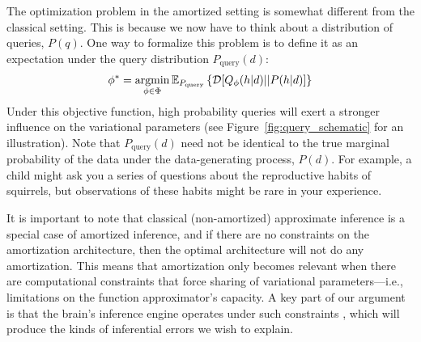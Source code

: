 The optimization problem in the amortized setting is somewhat different from the classical setting. This is because we now have to think about a distribution of queries, $P(q)$. One way to formalize this problem is to define it as an expectation under the query distribution $P_\text{query}(d)$:
\begin{align}
\phi^\ast = \operatorname*{argmin}_{\phi \in \Phi} \mathbb{E}_{P_\text{query}}\left\{ \mathcal{D}[Q_\phi(h|d)||P(h|d)] \right \}
\label{eq:amort}
\end{align}
Under this objective function, high probability queries will exert a stronger influence on the variational parameters (see Figure~\ref{fig:query_schematic} for an illustration). Note that $P_\text{query}(d)$ need not be identical to the true marginal probability of the data under the data-generating process, $P(d)$. For example, a child might ask you a series of questions about the reproductive habits of squirrels, but observations of these habits might be rare in your experience.

It is important to note that classical (non-amortized) approximate inference is a special case of amortized inference, and if there are no constraints on the amortization architecture, then the optimal architecture will not do any amortization. This means that amortization only becomes relevant when there are computational constraints that force sharing of variational parameters---i.e., limitations on the function approximator's capacity. A key part of our argument is that the brain's inference engine operates under such constraints \citep[see][]{feng2014multitasking,alon2017graph}, which will produce the kinds of inferential errors we wish to explain.

